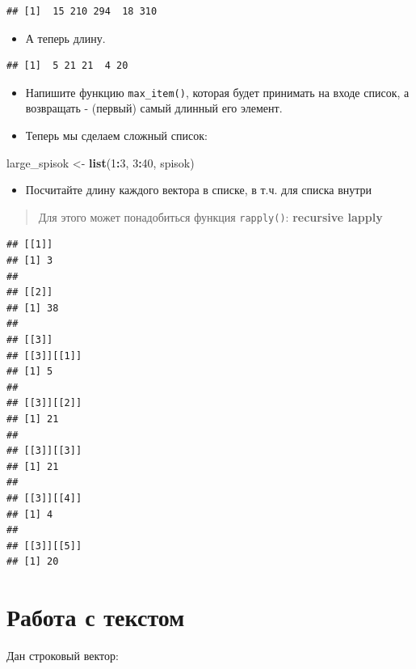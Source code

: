 \documentclass[]{book}
\newenvironment{Shaded}{\begin{snugshade}}{\end{snugshade}}
\newcommand{\KeywordTok}[1]{\textcolor[rgb]{0.13,0.29,0.53}{\textbf{#1}}}
\newcommand{\DecValTok}[1]{\textcolor[rgb]{0.00,0.00,0.81}{#1}}
\newcommand{\StringTok}[1]{\textcolor[rgb]{0.31,0.60,0.02}{#1}}
\newcommand{\OperatorTok}[1]{\textcolor[rgb]{0.81,0.36,0.00}{\textbf{#1}}}
\newcommand{\NormalTok}[1]{#1}
\providecommand{\tightlist}{%
  \setlength{\itemsep}{0pt}\setlength{\parskip}{0pt}}
\begin{document}
\begin{verbatim}
## [1]  15 210 294  18 310
\end{verbatim}

\begin{itemize}
\tightlist
\item
  А теперь длину.
\end{itemize}

\begin{verbatim}
## [1]  5 21 21  4 20
\end{verbatim}

\begin{itemize}
\item
  Напишите функцию \texttt{max\_item()}, которая будет принимать на
  входе список, а возвращать - (первый) самый длинный его элемент.
\item
  Теперь мы сделаем сложный список:
\end{itemize}

\begin{Shaded}
\begin{Highlighting}[]
\NormalTok{large_spisok <-}\StringTok{ }\KeywordTok{list}\NormalTok{(}\DecValTok{1}\OperatorTok{:}\DecValTok{3}\NormalTok{, }\DecValTok{3}\OperatorTok{:}\DecValTok{40}\NormalTok{, spisok)}
\end{Highlighting}
\end{Shaded}

\begin{itemize}
\tightlist
\item
  Посчитайте длину каждого вектора в списке, в т.ч. для списка внутри
\end{itemize}

\begin{quote}
Для этого может понадобиться функция \texttt{rapply()}:
\textbf{recursive lapply}
\end{quote}

\begin{verbatim}
## [[1]]
## [1] 3
## 
## [[2]]
## [1] 38
## 
## [[3]]
## [[3]][[1]]
## [1] 5
## 
## [[3]][[2]]
## [1] 21
## 
## [[3]][[3]]
## [1] 21
## 
## [[3]][[4]]
## [1] 4
## 
## [[3]][[5]]
## [1] 20
\end{verbatim}

\section{Работа с текстом}\label{task_test}

Дан строковый вектор:
\end{document}
